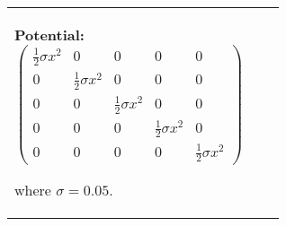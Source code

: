 \begin{longtable}{|p{\varnamewidth}|p{\vardescrwidth}|l}
\textbf{Potential:}
\begin{equation}
  \begin{pmatrix}
    \frac{1}{2} \sigma x^2 & 0                      & 0                      & 0                      & 0 \\
    0                      & \frac{1}{2} \sigma x^2 & 0                      & 0                      & 0 \\
    0                      & 0                      & \frac{1}{2} \sigma x^2 & 0                      & 0 \\
    0                      & 0                      & 0                      & \frac{1}{2} \sigma x^2 & 0 \\
    0                      & 0                      & 0                      & 0                      & \frac{1}{2} \sigma x^2
  \end{pmatrix}
\end{equation}

where $\sigma = 0.05$.
&\\
\cline{1-2}
\end{longtable}

